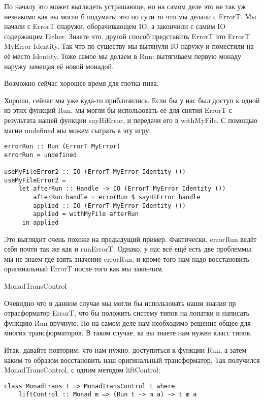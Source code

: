 По началу это может выглядеть устрашающе, но на самом деле это не так уж незнакомо как вы могли б подумать: это по сути то что мы делали с ErrorT. Мы начали с ErrorT снаружи, оборачивающем IO, а закончили с самим IO содержащим Either. Знаете что, другой способ представить ErrorT это ErrorT MyError Identity. Так что по существу мы вытянули IO наружу и поместили на её место Identity. Тоже самое мы делаем в Run: вытягиваем первую монаду наружу замещая её новой монадой.

Возможно сейчас хорошее время для глотка пива.

Хорошо, сейчас мы уже куда-то приблизились. Если бы у нас был доступ к одной из этих функций Run, мы могли бы использовать её для снятия ErrorT с результата нашей функции sayHiError, и передачи его в withMyFile. С помощью магии undefined мы можем сыграть в эту игру:

\begin{lstlisting}
errorRun :: Run (ErrorT MyError)
errorRun = undefined

useMyFileError2 :: IO (ErrorT MyError Identity ())
useMyFileError2 =
    let afterRun :: Handle -> IO (ErrorT MyError Identity ())
        afterRun handle = errorRun $ sayHiError handle
        applied :: IO (ErrorT MyError Identity ())
        applied = withMyFile afterRun
     in applied
\end{lstlisting}

Это выглядит очень похоже на предыдущий пример. Фактически, errorRun ведёт себя почти так же как и runErrorT. Однако, у нас всё ещё есть две проблеммы: мы не знаем где взять значение errorRun, и кроме того нам надо восстановить оригинальный ErrorT после того как мы закончим.

MonadTransControl

Очевидно что в данном случае мы могли бы использовать наши знания пр отрасформатор ErrorT, что бы положить систему типов на лопатки и написать функцию Run вручную. Но на самом деле нам необходимо решение общее для многих трансформаторов. В таком случае, ка вы знаете нам нужен класс типов.

Итак, давайте повторим, что нам нужно: доступиться к функции Run, а затем каким-то образом восстановить наш оригинальный трансформатор. Так получился MonadTransControl, с одним методом liftControl:

\begin{lstlisting}
class MonadTrans t => MonadTransControl t where
    liftControl :: Monad m => (Run t -> m a) -> t m a
\end{lstlisting}


